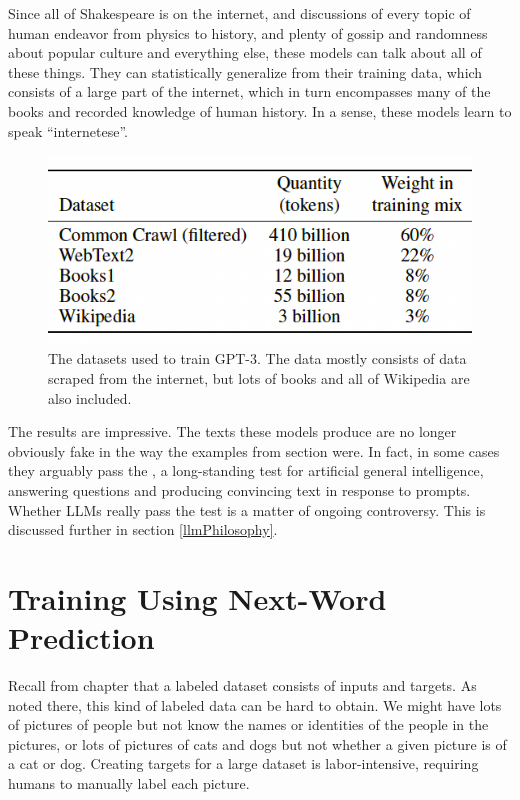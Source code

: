 Since all of Shakespeare is on the internet, and discussions of every topic of human endeavor from physics to history, and plenty of gossip and randomness about popular culture and everything else, these models can talk about all of these things. They can statistically generalize from their training data, which consists of a large part of the internet, which in turn encompasses many of the books and recorded knowledge of human history. In a sense, these models learn to speak ``internetese''. 

\begin{figure}[h]
\centering
\includegraphics[scale=.4]{./images/gptDatasets}
\caption[From \cite{brown2020language}.]{The datasets used to train GPT-3. The data mostly consists of data scraped from the internet, but lots of books and all of Wikipedia are also included.}
\label{gptDatasets}
\end{figure}

The results are impressive. The texts these models produce are no longer obviously fake in the way the examples from section  were. In fact, in some cases they arguably pass the , a long-standing test for artificial general intelligence, answering questions and producing convincing  text in response to prompts. Whether LLMs really pass the test is a matter of ongoing controversy. This is discussed further in section \ref{llmPhilosophy}.

\section{Training Using Next-Word Prediction}

Recall from chapter  that a labeled dataset consists of inputs and targets. As noted there, this kind of labeled data can be hard to obtain. We might have lots of pictures of people but not know the names or identities of the people in the pictures, or lots of pictures of cats and dogs but not whether a given picture is of a cat or dog. Creating targets for a large dataset is labor-intensive, requiring humans to manually label each picture.

